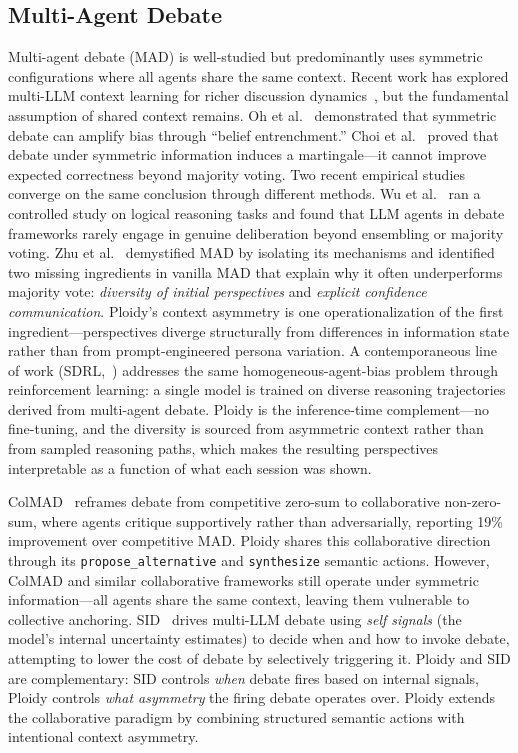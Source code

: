 \documentclass[11pt]{article}
\begin{document}
\subsection{Multi-Agent Debate}
\label{sec:mad}

Multi-agent debate (MAD) is well-studied but predominantly uses symmetric configurations where all agents share the same context. Recent work has explored multi-LLM context learning for richer discussion dynamics~\citep{m2cl2026}, but the fundamental assumption of shared context remains. Oh et al.~\citep{oh2025dreamad} demonstrated that symmetric debate can amplify bias through ``belief entrenchment.'' Choi et al.~\citep{choi2025debate} proved that debate under symmetric information induces a martingale---it cannot improve expected correctness beyond majority voting. Two recent empirical studies converge on the same conclusion through different methods. Wu et al.~\citep{wu2025reallydebate} ran a controlled study on logical reasoning tasks and found that LLM agents in debate frameworks rarely engage in genuine deliberation beyond ensembling or majority voting. Zhu et al.~\citep{zhu2026demystifying} demystified MAD by isolating its mechanisms and identified two missing ingredients in vanilla MAD that explain why it often underperforms majority vote: \emph{diversity of initial perspectives} and \emph{explicit confidence communication}. Ploidy's context asymmetry is one operationalization of the first ingredient---perspectives diverge structurally from differences in information state rather than from prompt-engineered persona variation. A contemporaneous line of work (SDRL,~\citep{sdrl2026}) addresses the same homogeneous-agent-bias problem through reinforcement learning: a single model is trained on diverse reasoning trajectories derived from multi-agent debate. Ploidy is the inference-time complement---no fine-tuning, and the diversity is sourced from asymmetric context rather than from sampled reasoning paths, which makes the resulting perspectives interpretable as a function of what each session was shown.

ColMAD~\citep{chen2025colmad} reframes debate from competitive zero-sum to collaborative non-zero-sum, where agents critique supportively rather than adversarially, reporting 19\% improvement over competitive MAD. Ploidy shares this collaborative direction through its \texttt{propose\_alternative} and \texttt{synthesize} semantic actions. However, ColMAD and similar collaborative frameworks still operate under symmetric information---all agents share the same context, leaving them vulnerable to collective anchoring. SID~\citep{chen2025sid} drives multi-LLM debate using \emph{self signals} (the model's internal uncertainty estimates) to decide when and how to invoke debate, attempting to lower the cost of debate by selectively triggering it. Ploidy and SID are complementary: SID controls \emph{when} debate fires based on internal signals, Ploidy controls \emph{what asymmetry} the firing debate operates over. Ploidy extends the collaborative paradigm by combining structured semantic actions with intentional context asymmetry.
\end{document}
